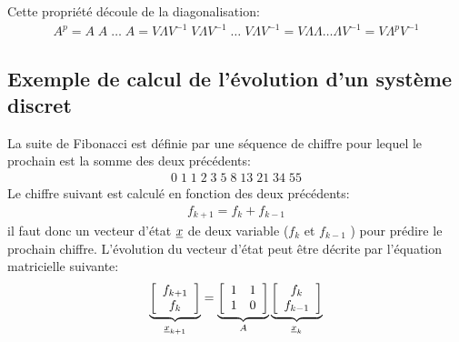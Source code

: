 Cette propriété découle de la diagonalisation:
\begin{align}
A^p = A \; A \; \hdots \; A = V \Lambda V^{-1} \; V \Lambda V^{-1} \;  \hdots \; V \Lambda V^{-1} = V \Lambda \Lambda   \hdots \Lambda V^{-1} = V \Lambda^p V^{-1}
\end{align}

\subsection{Exemple de calcul de l'évolution d'un système discret}

La suite de Fibonacci est définie par une séquence de chiffre pour lequel le prochain est la somme des deux précédents:
\begin{align}
0 \; 1\;1\;2\;3\;5\;8\;13\;21\;34\;55
\end{align}
Le chiffre suivant est calculé en fonction des deux précédents:
\begin{align}
f_{k+1} = f_{k} + f_{k-1}
\end{align}
il faut donc un vecteur d'état $\underline{x}$ de deux variable ($f_{k}$ et $f_{k-1}$ ) pour prédire le prochain chiffre. L'évolution du vecteur d'état peut être décrite par l'équation matricielle suivante:
\begin{align}
\underbrace{
\left[ \begin{array}{c}  
f_{k+1} \\ f_{k}
\end{array} \right]
}_{\underline{x}_{k+1}}
=
\underbrace{
\left[ \begin{array}{c c}  
1 & 1 \\ 1 & 0 
\end{array} \right]
}_{A}
\underbrace{
\left[ \begin{array}{c}  
f_{k} \\ f_{k-1}
\end{array} \right]
}_{\underline{x}_{k}}
\end{align}

